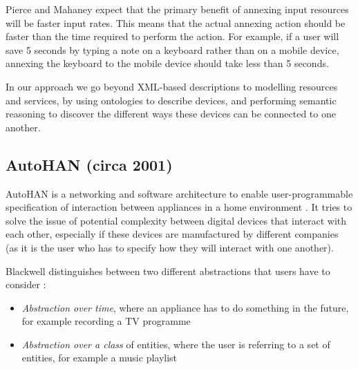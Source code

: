 
Pierce and Mahaney expect that the primary benefit of annexing input resources will be faster input rates. This means that the actual annexing action should be faster than the time required to perform the action. For example, if a user will save 5 seconds by typing a note on a keyboard rather than on a mobile device, annexing the keyboard to the mobile device should take less than 5 seconds.

In our approach we go beyond \ac{XML}-based descriptions to modelling resources and services, by using ontologies to describe devices, and performing semantic reasoning to discover the different ways these devices can be connected to one another. 

\subsection{AutoHAN (circa 2001)}
\label{autohan}
AutoHAN is a networking and software architecture to enable user-programmable specification of interaction between appliances in a home environment \cite{Blackwell2001}. It tries to solve the issue of potential complexity between digital devices that interact with each other, especially if these devices are manufactured by different companies (as it is the user who has to specify how they will interact with one another).

Blackwell distinguishes between two different abstractions that users have to consider  \cite{Blackwell2001}:
\begin{itemize}
	\item \emph{Abstraction over time}, where an appliance has to do something in the future, for example recording a TV programme
	\item \emph{Abstraction over a class} of entities, where the user is referring to a set of entities, for example a music playlist
\end{itemize}


